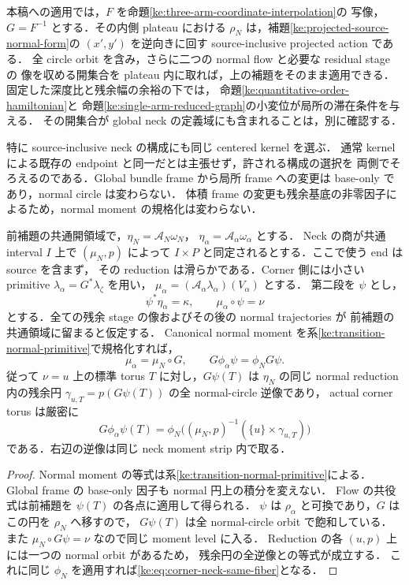 本稿への適用では，$F$ を命題\ref{ke:three-arm-coordinate-interpolation}の
写像，$G=F^{-1}$ とする．その内側 plateau における
$\rho_N$ は，補題\ref{ke:projected-source-normal-form}の
$(x',y')$ を逆向きに回す source-inclusive projected action である．
全 circle orbit を含み，さらに二つの normal flow と必要な residual stage の
像を収める開集合を plateau 内に取れば，上の補題をそのまま適用できる．
固定した深度比と残余幅の余裕の下では，
命題\ref{ke:quantitative-order-hamiltonian}と
命題\ref{ke:single-arm-reduced-graph}の小変位が局所の滞在条件を与える．
その開集合が global neck の定義域にも含まれることは，別に確認する．

特に source-inclusive neck の構成にも同じ centered kernel を選ぶ．
通常 kernel による既存の endpoint と同一だとは主張せず，許される構成の選択を
両側でそろえるのである．Global bundle frame から局所 frame への変更は
base-only であり，normal circle は変わらない．
体積 frame の変更も残余基底の非零因子によるため，normal moment の規格化は変わらない．

\begin{corollary}
\label{ke:corner-leaves-in-neck-reduction}
前補題の共通開領域で，$\eta_N=\mathcal A_N\omega_N$，
$\eta_\alpha=\mathcal A_\alpha\omega_\alpha$ とする．
Neck の商が共通 interval $I$ 上で $(\mu_N,p)$ によって
$I\times P$ と同定されるとする．ここで使う end は source を含まず，
その reduction は滑らかである．Corner 側には小さい primitive
$\lambda_\alpha=G^*\lambda_\zeta$ を用い，
$\mu_\alpha=(\mathcal A_\alpha\lambda_\alpha)(V_\alpha)$ とする．
第二段を $\psi$ とし，
\[
 \psi^*\eta_\alpha=\kappa,\qquad
 \mu_\alpha\circ\psi=\nu
\]
とする．全ての残余 stage の像およびその後の normal trajectories が
前補題の共通領域に留まると仮定する．
Canonical normal moment を系\ref{ke:transition-normal-primitive}で規格化すれば，
\[
 \mu_\alpha=\mu_N\circ G,\qquad
 G\phi_\alpha\psi=\phi_NG\psi.
\]
従って $\nu=u$ 上の標準 torus $T$ に対し，$G\psi(T)$ は
$\eta_N$ の同じ normal reduction 内の残余円
$\gamma_{u,T}=p(G\psi(T))$ の全 normal-circle 逆像であり，
actual corner torus は厳密に
\begin{equation}\label{ke:eq:corner-neck-same-fiber}
 G\phi_\alpha\psi(T)
 =\phi_N\bigl((\mu_N,p)^{-1}(\{u\}\times\gamma_{u,T})\bigr)
\end{equation}
である．右辺の逆像は同じ neck moment strip 内で取る．
\end{corollary}
\begin{proof}
Normal moment の等式は系\ref{ke:transition-normal-primitive}による．
Global frame の base-only 因子も normal 円上の積分を変えない．
Flow の共役式は前補題を $\psi(T)$ の各点に適用して得られる．
$\psi$ は $\rho_\alpha$ と可換であり，$G$ はこの円を $\rho_N$ へ移すので，
$G\psi(T)$ は全 normal-circle orbit で飽和している．
また $\mu_N\circ G\psi=\nu$ なので同じ moment level に入る．
Reduction の各 $(u,p)$ 上には一つの normal orbit があるため，
残余円の全逆像との等式が成立する．
これに同じ $\phi_N$ を適用すれば\eqref{ke:eq:corner-neck-same-fiber}となる．
\end{proof}

